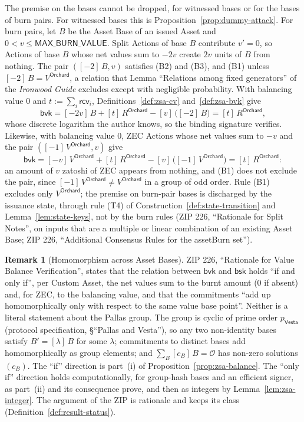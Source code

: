 \documentclass[11pt,a4paper]{article}
\theoremstyle{definition}
\newtheorem{remark}[theorem]{Remark}
\newcommand{\Vesta}{\ensuremath{\mathsf{Vesta}}}
\newcommand{\rcv}{\ensuremath{\mathsf{rcv}}}
\begin{document}
The premise on the bases cannot be dropped, for witnessed bases or for
the bases of burn pairs. For witnessed bases this is
Proposition~\ref{prop:dummy-attack}. For burn pairs, let $B$ be the Asset
Base of an issued Asset and $0 < v \le \mathsf{MAX\_BURN\_VALUE}$. Split
Actions of base $B$ contribute $v' = 0$, so Actions of base $B$ whose net
values sum to $-2v$ create $2v$ units of $B$ from nothing. The pair
$([-2]\,B, v)$ satisfies (B2) and (B3), and (B1) unless
$[-2]\,B = V^{\mathsf{Orchard}}$, a relation that Lemma ``Relations among
fixed generators'' of the \emph{Ironwood Guide} excludes except with
negligible probability. With balancing value $0$ and $t :=
\sum_i \rcv_i$, Definitions~\ref{def:zsa-cv} and~\ref{def:zsa-bvk} give
\[
  \mathsf{bvk} = [-2v]\,B + [t]\,R^{\mathsf{Orchard}}
    - [v]\,\bigl([-2]\,B\bigr)
  = [t]\,R^{\mathsf{Orchard}},
\]
whose discrete logarithm the author knows, so the binding signature
verifies. Likewise, with balancing value $0$, ZEC Actions whose net values
sum to $-v$ and the pair $([-1]\,V^{\mathsf{Orchard}}, v)$ give
\[
  \mathsf{bvk} = [-v]\,V^{\mathsf{Orchard}} + [t]\,R^{\mathsf{Orchard}}
    - [v]\,\bigl([-1]\,V^{\mathsf{Orchard}}\bigr)
  = [t]\,R^{\mathsf{Orchard}}:
\]
an amount of $v$ zatoshi of ZEC appears from nothing, and (B1) does not
exclude the pair, since $[-1]\,V^{\mathsf{Orchard}} \neq
V^{\mathsf{Orchard}}$ in a group of odd order. Rule (B1) excludes only
$V^{\mathsf{Orchard}}$; the premise on burn-pair bases is discharged by
the issuance state, through rule (T4) of
Construction~\ref{def:state-transition} and Lemma~\ref{lem:state-keys}, not
by the burn rules (ZIP 226, ``Rationale for Split Notes'', on inputs that
are a multiple or linear combination of an existing Asset Base; ZIP 226,
``Additional Consensus Rules for the assetBurn set'').

\begin{remark}[Homomorphism across Asset Bases]\label{rem:zip-iff}
ZIP 226, ``Rationale for Value Balance Verification'', states that the
relation between $\mathsf{bvk}$ and $\mathsf{bsk}$ holds ``if and only
if'', per Custom Asset, the net values sum to the burnt amount ($0$ if
absent) and, for ZEC, to the balancing value, and that the commitments
``add up homomorphically only with respect to the same value base point''.
Neither is a literal statement about the Pallas group. The group is cyclic
of prime order $p_{\Vesta}$ (protocol specification, \S``Pallas and
Vesta''), so any two non-identity bases satisfy $B' = [\lambda]\,B$ for
some $\lambda$; commitments to distinct bases add homomorphically as group
elements; and $\sum_B [c_B]\,B = \mathcal{O}$ has non-zero solutions
$(c_B)$. The ``if'' direction is part~(i) of
Proposition~\ref{prop:zsa-balance}. The ``only if'' direction holds
computationally, for group-hash bases and an efficient signer, as part~(ii)
and its consequence prove, and then as integers by
Lemma~\ref{lem:zsa-integer}. The argument of the ZIP is rationale and keeps
its class (Definition~\ref{def:result-status}).
\end{remark}
\end{document}
